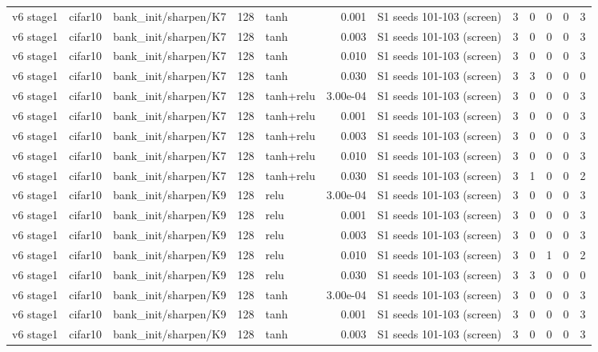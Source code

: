 \begin{table}[htbp]
{\begin{tabular}{@{}lllrlrlrrrrr@{}}
v6 stage1 & cifar10 & bank\_init/sharpen/K7 & 128 & tanh & 0.001 & S1 seeds 101-103 (screen) & 3 & 0 & 0 & 0 & 3 \\
v6 stage1 & cifar10 & bank\_init/sharpen/K7 & 128 & tanh & 0.003 & S1 seeds 101-103 (screen) & 3 & 0 & 0 & 0 & 3 \\
v6 stage1 & cifar10 & bank\_init/sharpen/K7 & 128 & tanh & 0.010 & S1 seeds 101-103 (screen) & 3 & 0 & 0 & 0 & 3 \\
v6 stage1 & cifar10 & bank\_init/sharpen/K7 & 128 & tanh & 0.030 & S1 seeds 101-103 (screen) & 3 & 3 & 0 & 0 & 0 \\
v6 stage1 & cifar10 & bank\_init/sharpen/K7 & 128 & tanh+relu & 3.00e-04 & S1 seeds 101-103 (screen) & 3 & 0 & 0 & 0 & 3 \\
v6 stage1 & cifar10 & bank\_init/sharpen/K7 & 128 & tanh+relu & 0.001 & S1 seeds 101-103 (screen) & 3 & 0 & 0 & 0 & 3 \\
v6 stage1 & cifar10 & bank\_init/sharpen/K7 & 128 & tanh+relu & 0.003 & S1 seeds 101-103 (screen) & 3 & 0 & 0 & 0 & 3 \\
v6 stage1 & cifar10 & bank\_init/sharpen/K7 & 128 & tanh+relu & 0.010 & S1 seeds 101-103 (screen) & 3 & 0 & 0 & 0 & 3 \\
v6 stage1 & cifar10 & bank\_init/sharpen/K7 & 128 & tanh+relu & 0.030 & S1 seeds 101-103 (screen) & 3 & 1 & 0 & 0 & 2 \\
v6 stage1 & cifar10 & bank\_init/sharpen/K9 & 128 & relu & 3.00e-04 & S1 seeds 101-103 (screen) & 3 & 0 & 0 & 0 & 3 \\
v6 stage1 & cifar10 & bank\_init/sharpen/K9 & 128 & relu & 0.001 & S1 seeds 101-103 (screen) & 3 & 0 & 0 & 0 & 3 \\
v6 stage1 & cifar10 & bank\_init/sharpen/K9 & 128 & relu & 0.003 & S1 seeds 101-103 (screen) & 3 & 0 & 0 & 0 & 3 \\
v6 stage1 & cifar10 & bank\_init/sharpen/K9 & 128 & relu & 0.010 & S1 seeds 101-103 (screen) & 3 & 0 & 1 & 0 & 2 \\
v6 stage1 & cifar10 & bank\_init/sharpen/K9 & 128 & relu & 0.030 & S1 seeds 101-103 (screen) & 3 & 3 & 0 & 0 & 0 \\
v6 stage1 & cifar10 & bank\_init/sharpen/K9 & 128 & tanh & 3.00e-04 & S1 seeds 101-103 (screen) & 3 & 0 & 0 & 0 & 3 \\
v6 stage1 & cifar10 & bank\_init/sharpen/K9 & 128 & tanh & 0.001 & S1 seeds 101-103 (screen) & 3 & 0 & 0 & 0 & 3 \\
v6 stage1 & cifar10 & bank\_init/sharpen/K9 & 128 & tanh & 0.003 & S1 seeds 101-103 (screen) & 3 & 0 & 0 & 0 & 3 \\

\end{tabular}}
\end{table}
